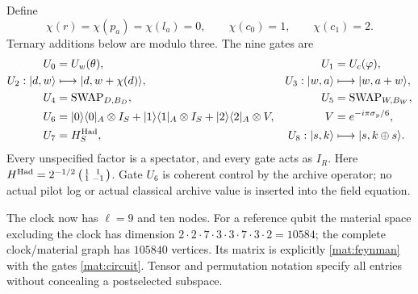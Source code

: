 \documentclass[11pt]{article}
\theoremstyle{definition}\newtheorem{definition}[theorem]{Definition}
\theoremstyle{remark}\newtheorem{remark}[theorem]{Remark}
\begin{document}
Define
\begin{equation}\label{mat:status}
 \chi(r)=\chi(p_a)=\chi(l_a)=0,\qquad
 \chi(c_0)=1,\qquad\chi(c_1)=2.
\end{equation}
Ternary additions below are modulo three.  The nine gates are
\begin{align}\label{mat:circuit}
 U_0&=U_w(\theta),& U_1&=U_c(\varphi),\nonumber\\
 U_2: |d,w\rangle&\longmapsto|d,w+\chi(d)\rangle,
 &U_3: |w,a\rangle&\longmapsto|w,a+w\rangle,\nonumber\\
 U_4&=\operatorname{SWAP}_{D,B_D},
 &U_5&=\operatorname{SWAP}_{W,B_W},\\
 U_6&=|0\rangle\langle0|_A\otimes I_S
       +|1\rangle\langle1|_A\otimes I_S
       +|2\rangle\langle2|_A\otimes V,
 &V&=e^{-i\pi\sigma_y/6},\nonumber\\
 U_7&=H_S^{\rm Had},
 &U_8: |s,k\rangle&\longmapsto|s,k\mathbin{\oplus}s\rangle.
 \nonumber
\end{align}
Every unspecified factor is a spectator, and every gate acts as
$I_R$.  Here
$H^{\rm Had}=2^{-1/2}\left(\begin{smallmatrix}1&1\\1&-1\end{smallmatrix}\right)$.
Gate $U_6$ is coherent control by the archive operator; no actual
pilot log or actual classical archive value is inserted into the
field equation.

The clock now has $\ell=9$ and ten nodes.  For a reference qubit the
material space excluding the clock has dimension
$2\cdot2\cdot7\cdot3\cdot3\cdot7\cdot3\cdot2=10584$; the complete
clock/material graph has $105840$ vertices.  Its matrix is explicitly
\eqref{mat:feynman} with the gates \eqref{mat:circuit}.  Tensor and
permutation notation specify all entries without concealing a
postselected subspace.
\end{document}
